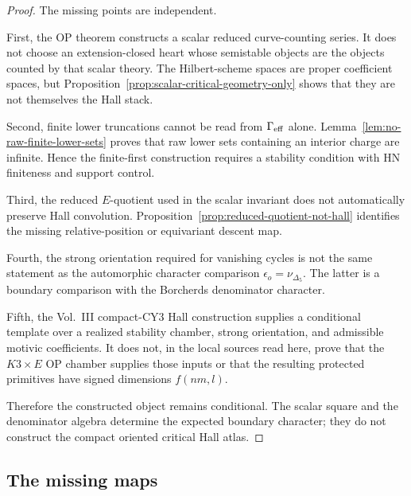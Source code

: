 \begin{proof}
The missing points are independent.

First, the OP theorem constructs a scalar reduced curve-counting series.
It does not choose an extension-closed heart whose semistable objects are
the objects counted by that scalar theory.  The Hilbert-scheme spaces
are proper coefficient spaces, but Proposition~\ref{prop:scalar-critical-geometry-only}
shows that they are not themselves the Hall stack.

Second, finite lower truncations cannot be read from
\(\Gamma_{\mathrm{eff}}\) alone.  Lemma~\ref{lem:no-raw-finite-lower-sets} proves
that raw lower sets containing an interior charge are infinite.  Hence
the finite-first construction requires a stability condition with HN
finiteness and support control.

Third, the reduced \(E\)-quotient used in the scalar invariant does not
automatically preserve Hall convolution.  Proposition~\ref{prop:reduced-quotient-not-hall}
identifies the missing relative-position or equivariant descent map.

Fourth, the strong orientation required for vanishing cycles is not the
same statement as the automorphic character comparison
\(\epsilon_o=\nu_{\Delta_5}\).  The latter is a boundary comparison with
the Borcherds denominator character.

Fifth, the Vol.~III compact-CY3 Hall construction supplies a conditional
template over a realized stability chamber, strong orientation, and
admissible motivic coefficients.  It does not, in the local sources
read here, prove that the \(K3\times E\) OP chamber supplies those
inputs or that the resulting protected primitives have signed
dimensions \(f(nm,l)\).

Therefore the constructed object remains conditional.  The scalar square
and the denominator algebra determine the expected boundary character;
they do not construct the compact oriented critical Hall atlas.
\end{proof}

\subsection{The missing maps}

